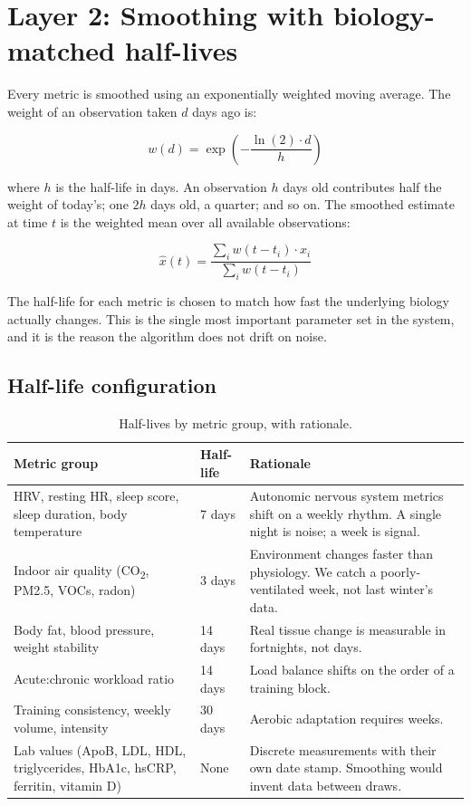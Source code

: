 \documentclass[10pt, a4paper]{article}
\begin{document}
\section{Layer 2: Smoothing with biology-matched half-lives}

Every metric is smoothed using an exponentially weighted moving average. The weight of an observation taken $d$ days ago is:

\begin{equation}
w(d) = \exp\!\left(-\frac{\ln(2) \cdot d}{h}\right)
\label{eq:ewma}
\end{equation}

where $h$ is the half-life in days. An observation $h$ days old contributes half the weight of today's; one $2h$ days old, a quarter; and so on. The smoothed estimate at time $t$ is the weighted mean over all available observations:

\begin{equation}
\hat{x}(t) = \frac{\sum_{i} w(t - t_i) \cdot x_i}{\sum_{i} w(t - t_i)}
\label{eq:ewma_mean}
\end{equation}

The half-life for each metric is chosen to match how fast the underlying biology actually changes. This is the single most important parameter set in the system, and it is the reason the algorithm does not drift on noise.

\subsection{Half-life configuration}

\begin{table}[h]
\centering
\caption{Half-lives by metric group, with rationale.}
\label{tab:halflives}
\small
\begin{tabularx}{\linewidth}{@{} L{4.6cm} L{1.8cm} X @{}}
\toprule
\textbf{Metric group} & \textbf{Half-life} & \textbf{Rationale} \\
\midrule
HRV, resting HR, sleep score, sleep duration, body temperature & 7 days & Autonomic nervous system metrics shift on a weekly rhythm. A single night is noise; a week is signal. \\
Indoor air quality (CO\textsubscript{2}, PM2.5, VOCs, radon) & 3 days & Environment changes faster than physiology. We catch a poorly-ventilated week, not last winter's data. \\
Body fat, blood pressure, weight stability & 14 days & Real tissue change is measurable in fortnights, not days. \\
Acute:chronic workload ratio & 14 days & Load balance shifts on the order of a training block. \\
Training consistency, weekly volume, intensity & 30 days & Aerobic adaptation requires weeks. \\
Lab values (ApoB, LDL, HDL, triglycerides, HbA1c, hsCRP, ferritin, vitamin D) & None & Discrete measurements with their own date stamp. Smoothing would invent data between draws. \\
\bottomrule
\end{tabularx}
\end{table}
\end{document}
